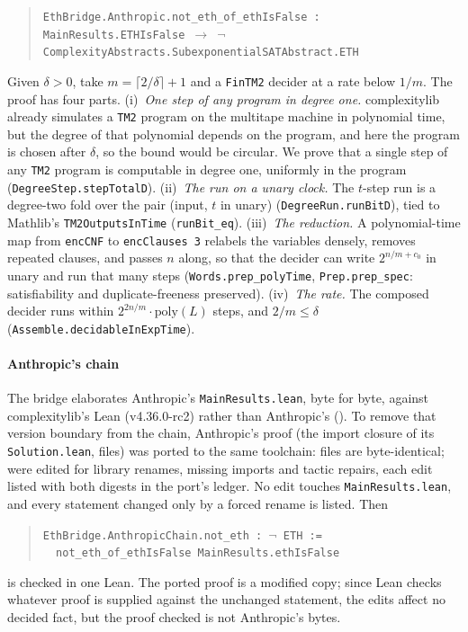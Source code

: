 \documentclass[preprint,11pt,authoryear,a4paper]{elsarticle}
\newcommand{\lean}[1]{\texttt{#1}}
\begin{document}
\begin{quote}
\lean{EthBridge.Anthropic.not\_eth\_of\_ethIsFalse : MainResults.ETHIsFalse $\to$ $\neg$\,ComplexityAbstracts.SubexponentialSATAbstract.ETH}
\end{quote}
Given $\delta>0$, take $m=\lceil 2/\delta\rceil+1$ and a \lean{FinTM2} decider at a rate below $1/m$. The proof has four parts.
(i)~\emph{One step of any program in degree one.} complexitylib already simulates a \lean{TM2} program on the multitape machine in polynomial time, but the degree of that polynomial depends on the program, and here the program is chosen after $\delta$, so the bound would be circular. We prove that a single step of any \lean{TM2} program is computable in degree one, uniformly in the program (\lean{DegreeStep.stepTotalD}).
(ii)~\emph{The run on a unary clock.} The $t$-step run is a degree-two fold over the pair (input, $t$ in unary) (\lean{DegreeRun.runBitD}), tied to Mathlib's \lean{TM2OutputsInTime} (\lean{runBit\_eq}).
(iii)~\emph{The reduction.} A polynomial-time map from \lean{encCNF} to \lean{encClauses 3} relabels the variables densely, removes repeated clauses, and passes $n$ along, so that the decider can write $2^{n/m+c_0}$ in unary and run that many steps (\lean{Words.prep\_polyTime}, \lean{Prep.prep\_spec}: satisfiability and duplicate-freeness preserved).
(iv)~\emph{The rate.} The composed decider runs within $2^{2n/m}\cdot\mathrm{poly}(L)$ steps, and $2/m\le\delta$ (\lean{Assemble.decidableInExpTime}).

\paragraph{Anthropic's chain} The bridge elaborates Anthropic's \lean{MainResults.lean}, byte for byte, against complexitylib's Lean (v4.36.0-rc2) rather than Anthropic's (\EcAnthropicLean). To remove that version boundary from the chain, Anthropic's proof (the import closure of its \lean{Solution.lean}, \EcPortFiles{} files) was ported to the same toolchain: \EcPortSame{} files are byte-identical; \EcPortEdited{} were edited for library renames, missing imports and tactic repairs, each edit listed with both digests in the port's ledger. No edit touches \lean{MainResults.lean}, and every statement changed only by a forced rename is listed. Then
\begin{quote}
\lean{EthBridge.AnthropicChain.not\_eth : $\neg$\,ETH :=}\\
\lean{\ \ not\_eth\_of\_ethIsFalse MainResults.ethIsFalse}
\end{quote}
is checked in one Lean. The ported proof is a modified copy; since Lean checks whatever proof is supplied against the unchanged statement, the edits affect no decided fact, but the proof checked is not Anthropic's bytes.
\end{document}
